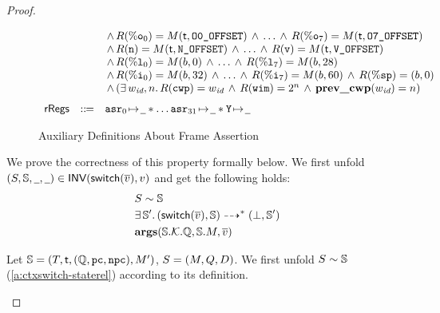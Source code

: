 \begin{proof}
\begin{enumerate}
\begin{figure}[!t]
\[\begin{array}{lcl}
                    & & \, \land \, 
                    \RFile(\oreg{0}) = \Mem(\thrdid, \ofsOOne) \, \land \, \dots \, \land \, 
                    \RFile(\oreg{7}) = \Mem(\thrdid, \ofsOEig)  \\
                    & & \, \land \, 
                    \RFile(\regn) = \Mem(\thrdid, \ofsN) \, \land \, \dots \, \land \, 
                    \RFile(\regv) = \Mem(\thrdid, \ofsV) \\
                    & & \, \land \, 
                    \RFile(\lreg{0}) = \Mem(\block, 0) \, \land \, \dots \, \land \, 
                    \RFile(\lreg{7}) = \Mem(\block, 28) \\
                    & & \, \land \, 
                    \RFile(\ireg{0}) = \Mem(\block, 32) \, \land \, \dots \, \land \, 
                    \RFile(\ireg{7}) = \Mem(\block, 60) \, \land \, 
                    \RFile(\spreg) = (\block, 0) \\
                    & & \, \land \, 
                    (\exists \, \cwp, n. \, \RFile(\regcwp) = \cwp \, \land \, 
                    \RFile(\regwim) = 2^n \, \land \, \prevcwp{(\cwp)} = n) \\
                    \\[-5pt]
                    \rRegs & \define & \regst{\asr_0}{\notCare} \sepstar \dots 
                        \regst{\asr_{31}}{\notCare} \sepstar \regst{\regY}{\notCare} 
                \end{array}
            \]
            \caption{Auxiliary Definitions About Frame Assertion}
        \end{figure}

        We prove the correctness of this property formally
        below. We first unfold 
        $(S, \mathbb{S}, \underline{\ \,}, \underline{\ \,}) \in \textsf{INV}{(\mathsf{switch}(\overline{v}), v)}$
        and get the following holds:
        \begin{align}
            & {S} \sim {\mathbb{S}} \label{a:ctxswitch-staterel} \\
            & \exists \, \mathbb{S}'. \, 
                {(\mathsf{switch}(\overline{v}), \mathbb{S})} \dashrightarrow^{*} {(\perp, \mathbb{S}')} \label{a:ctxswitch-swtrans} \\
            & \textbf{args}(\mathbb{S}.\mathcal{K}.\mathbb{Q}, \mathbb{S}.M, \overline{v})
        \end{align}

        Let $\mathbb{S} = (T, \textsf{t}, (\mathbb{Q}, \texttt{pc}, \texttt{npc}), M')$, 
        $S = (M, Q, D)$. We first unfold 
        ${S} \sim {\mathbb{S}}$ (\ref{a:ctxswitch-staterel})
        according to its definition. 
    \end{enumerate} 
\end{proof}

